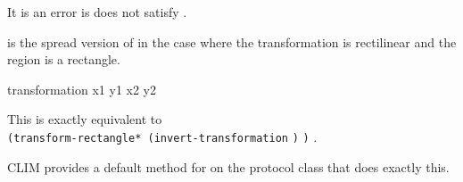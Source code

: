It is an error is  does not satisfy
.

 is the spread version of  in the
case where the transformation is rectilinear and the region is a rectangle.

 {transformation x1 y1 x2 y2}

This is exactly equivalent to \\
\verb+(transform-rectangle* (invert-transformation+ \verb+)+
   \verb+)+ .

CLIM provides a default method for  on the
 protocol class that does exactly this.
